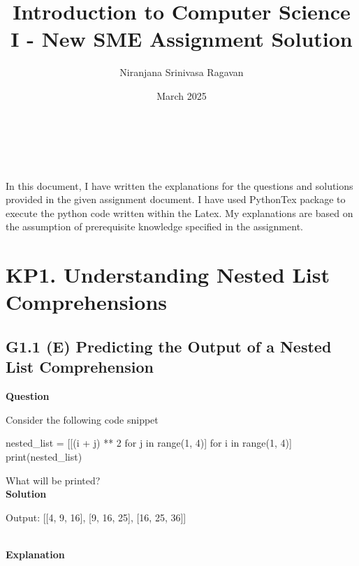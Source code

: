 \documentclass[10pt]{extarticle}
\title{Introduction to Computer Science I - New SME Assignment Solution}
\author{Niranjana Srinivasa Ragavan}
\date{March 2025}
\makeatletter
\renewcommand\maketitle{
    \null\vspace{4mm}
    \begin{center}
        {\Huge\sffamily\bfseries\selectfont\@title}\\
            \vspace{4mm}
        {\Large\sffamily\selectfont\@author}\\
            \vspace{4mm}
        {\large\sffamily\selectfont\@date}
    \end{center}
    \vspace{6mm}
}
\makeatother
\begin{document}
\maketitle

In this document, I have written the explanations for the questions and solutions provided in the given assignment document. I have used PythonTex package to execute the python code written within the Latex.
My explanations are based on the assumption of prerequisite knowledge specified in the assignment.

\section*{KP1. Understanding Nested List Comprehensions}
\subsection*{G1.1 (E) Predicting the Output of a Nested List Comprehension}

\textbf{Question}

Consider the following code snippet

    \begin{python}
    nested_list = [[(i + j) ** 2 for j in range(1, 4)] for i in range(1, 4)]
    print(nested_list)
    \end{python}

What will be printed? \\

\noindent\textbf{Solution}

\begin{python}
Output: [[4, 9, 16], [9, 16, 25], [16, 25, 36]]
\end{python}  \\

\noindent\textbf{Explanation} \\
\end{document}
